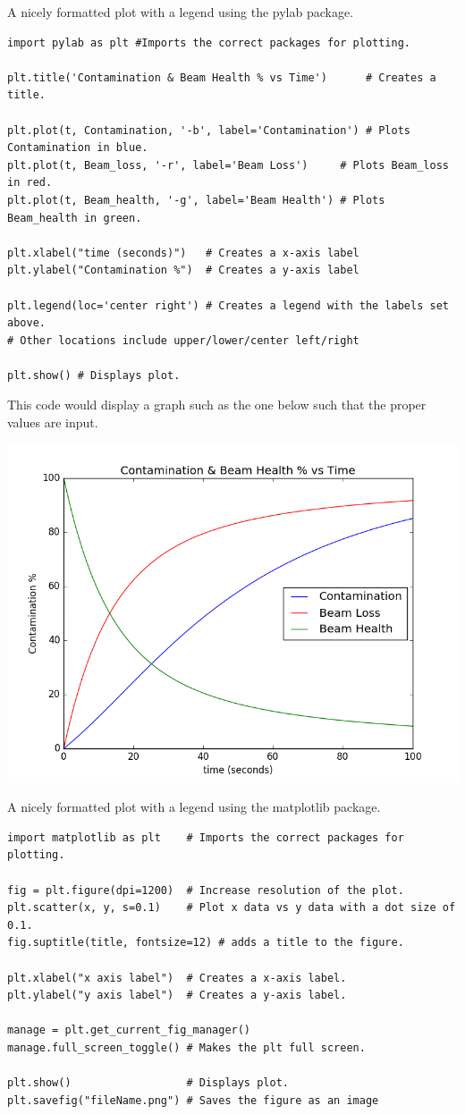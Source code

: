 A nicely formatted plot with a legend using the pylab package.
\begin{lstlisting}
import pylab as plt #Imports the correct packages for plotting.

plt.title('Contamination & Beam Health % vs Time')      # Creates a title.

plt.plot(t, Contamination, '-b', label='Contamination') # Plots Contamination in blue.
plt.plot(t, Beam_loss, '-r', label='Beam Loss')     # Plots Beam_loss in red.
plt.plot(t, Beam_health, '-g', label='Beam Health') # Plots Beam_health in green.

plt.xlabel("time (seconds)")   # Creates a x-axis label
plt.ylabel("Contamination %")  # Creates a y-axis label

plt.legend(loc='center right') # Creates a legend with the labels set above.
# Other locations include upper/lower/center left/right

plt.show() # Displays plot.
\end{lstlisting}
This code would display a graph such as the one below such that the proper values are input.

\includegraphics[width=0.5\linewidth]{./Images/Figures/figure_1-4}

A nicely formatted plot with a legend using the matplotlib package.
\begin{lstlisting}
import matplotlib as plt    # Imports the correct packages for plotting.

fig = plt.figure(dpi=1200)  # Increase resolution of the plot.
plt.scatter(x, y, s=0.1)    # Plot x data vs y data with a dot size of 0.1.
fig.suptitle(title, fontsize=12) # adds a title to the figure.

plt.xlabel("x axis label")  # Creates a x-axis label.
plt.ylabel("y axis label")  # Creates a y-axis label.

manage = plt.get_current_fig_manager()
manage.full_screen_toggle() # Makes the plt full screen.

plt.show()                  # Displays plot.
plt.savefig("fileName.png") # Saves the figure as an image
\end{lstlisting}















